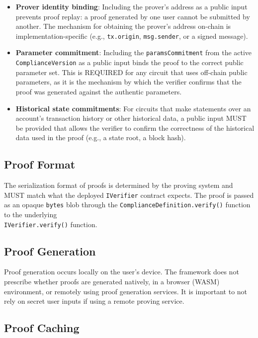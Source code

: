 \documentclass[9pt]{extreport}
\begin{document}
\begin{itemize}
    \item \textbf{Prover identity binding}: Including the prover's address as a public input prevents proof replay: a proof generated by one user cannot be submitted by another. The mechanism for obtaining the prover's address on-chain is implementation-specific (e.g., \texttt{tx.origin}, \texttt{msg.sender}, or a signed message).
    \item \textbf{Parameter commitment}: Including the \texttt{paramsCommitment} from the active \\ \texttt{ComplianceVersion} as a public input binds the proof to the correct public parameter set. This is REQUIRED for any circuit that uses off-chain public parameters, as it is the mechanism by which the verifier confirms that the proof was generated against the authentic parameters.
    \item \textbf{Historical state commitments}: For circuits that make statements over an account's transaction history or other historical data, a public input MUST be provided that allows the verifier to confirm the correctness of the historical data used in the proof (e.g., a state root, a block hash).
\end{itemize}

\subsection{Proof Format}
\label{sec:proof-format}

The serialization format of proofs is determined by the proving system and MUST match what the deployed \texttt{IVerifier} contract expects. The proof is passed as an opaque \texttt{bytes} blob through the \texttt{ComplianceDefinition.verify()} function to the underlying \\ \texttt{IVerifier.verify()} function.

\subsection{Proof Generation}
\label{sec:proof-generation}

Proof generation occurs locally on the user's device.  The framework does not prescribe whether proofs are generated natively, in a browser (WASM) environment, or remotely using proof generation services.  It is important to not rely on secret user inputs if using a remote proving service.

\subsection{Proof Caching}
\label{sec:proof-caching}
\end{document}
